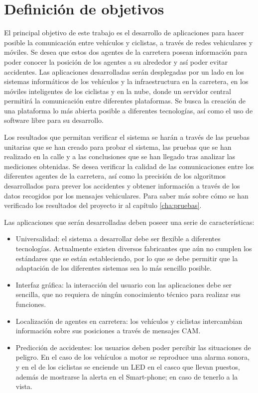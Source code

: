 \chapter{Definición de objetivos}
El principal objetivo de este trabajo es el desarrollo de aplicaciones para hacer posible la comunicación entre vehículos y ciclistas, a través de redes vehiculares y móviles. Se desea que estos dos agentes de la carretera posean información para poder conocer la posición de los agentes a su alrededor y así poder evitar accidentes. Las aplicaciones desarrolladas serán desplegadas por un lado en los sistemas informáticos de los vehículos y la infraestructura en la carretera, en los móviles inteligentes de los ciclistas y en la nube, donde un servidor central permitirá la comunicación entre diferentes plataformas. Se busca la creación de una plataforma lo más abierta posible a diferentes tecnologías, así como el uso de software libre para su desarrollo.

Los resultados que permitan verificar el sistema se harán a través de las pruebas unitarias que se han creado para probar el sistema, las pruebas que se han realizado en la calle y a las conclusiones que se han llegado tras analizar las mediciones obtenidas. Se desea verificar la calidad de las comunicaciones entre los diferentes agentes de la carretera, así como la precisión de los algoritmos desarrollados para prever los accidentes y obtener información a través de los datos recogidos por los mensajes vehiculares. Para saber más sobre cómo se han verificado los resultados del proyecto ir al capítulo \ref{cha:pruebas}.

Las aplicaciones que serán desarrolladas deben poseer una serie de características:
\begin{itemize}
	\item Universalidad: el sistema a desarrollar debe ser flexible a diferentes tecnologías. Actualmente existen diversos fabricantes que aún no cumplen los estándares que se están estableciendo, por lo que se debe permitir que la adaptación de los diferentes sistemas sea lo más sencillo posible.
	\item Interfaz gráfica: la interacción del usuario con las aplicaciones debe ser sencilla, que no requiera de ningún conocimiento técnico para realizar sus funciones.
	\item Localización de agentes en carretera: los vehículos y ciclistas intercambian información sobre sus posiciones a través de mensajes CAM.
	\item Predicción de accidentes: los usuarios deben poder percibir las situaciones de peligro. En el caso de los vehículos a motor se reproduce una alarma sonora, y en el de los ciclistas se enciende un LED en el casco que llevan puestos, además de mostrarse la alerta en el Smart-phone; en caso de tenerlo a la vista.
\end{itemize}